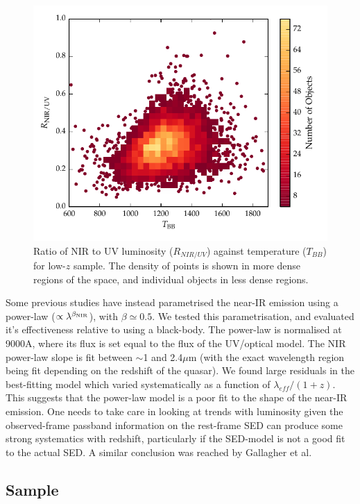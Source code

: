 \begin{figure}
  \centering
  \includegraphics[width=\textwidth]{figures/chapter05/ratio_tbb_density.pdf}
  \caption{Ratio of NIR to UV luminosity ($R_{NIR/UV}$) against temperature ($T_{BB}$) for low-$z$ sample. The density of points is shown in more dense regions of the space, and individual objects in less dense regions. }
  \label{fig:ratio_tbb_density}
\end{figure}

Some previous studies \citep[e.g.][]{wang13,zhang14} have instead parametrised the near-IR emission using a power-law ($\propto \lambda^{\beta_{\rm NIR}}$), with $\beta \simeq 0.5$. 
We tested this parametrisation, and evaluated it's effectiveness relative to using a black-body. 
The power-law is normalised at 9000A, where its flux is set equal to the flux of the UV/optical model. 
The NIR power-law slope is fit between $\sim$1 and 2.4$\mu$m (with the exact wavelength region being fit depending on the redshift of the quasar). 
We found large residuals in the best-fitting model which varied systematically as a function of $\lambda_{eff}/(1+z)$.  
This suggests that the power-law model is a poor fit to the shape of the near-IR emission. 
One needs to take care in looking at trends with luminosity given the observed-frame passband information on the rest-frame SED can produce some strong systematics with redshift, particularly if the SED-model is not a good fit to the actual SED. 
A similar conclusion was reached by Gallagher et al.

\subsection{Sample}

